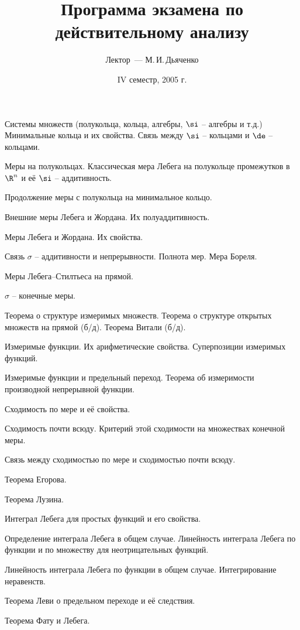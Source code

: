 \documentclass[a4paper]{article}
\title{Программа экзамена по действительному анализу}
\author{Лектор~--- М.\,И.\,Дьяченко}
\date{IV семестр, 2005 г.}
\begin{document}
\maketitle


\begin{nums}{-1}
\item Системы множеств (полукольца, кольца, алгебры, $\si$ -- алгебры и т.д.)
Минимальные кольца и их свойства. Связь между $\si$ -- кольцами и $\de$ -- кольцами.
\item Меры на полукольцах. Классическая мера Лебега на полукольце промежутков в
$\R^n$ и её $\si$ -- аддитивность.
\item Продолжение меры с полукольца на минимальное кольцо.
\item Внешние меры Лебега и Жордана. Их полуаддитивность.
\item Меры Лебега и Жордана. Их свойства.
\item Связь $\sigma $ -- аддитивности и непрерывности. Полнота мер. Мера Бореля.
\item Меры Лебега--Стилтьеса на прямой.
\item $\sigma $ -- конечные меры.
\item Теорема о структуре измеримых множеств. Теорема о структуре открытых множеств на прямой (б/д). Теорема Витали (б/д).
\item Измеримые функции. Их арифметические свойства. Суперпозиции измеримых функций.
\item Измеримые функции и предельный переход. Теорема об измеримости производной непрерывной функции.
\item Сходимость по мере и её свойства.
\item Сходимость почти всюду. Критерий этой сходимости на множествах конечной меры.
\item Связь между сходимостью по мере и сходимостью почти всюду.
\item Теорема Егорова.
\item Теорема Лузина.
\item Интеграл Лебега для простых функций и его свойства.
\item Определение интеграла Лебега в общем случае. Линейность интеграла Лебега
по функции и по множеству для неотрицательных функций.
\item Линейность интеграла Лебега по функции в общем случае. Интегрирование неравенств.
\item Теорема Леви о предельном переходе и её следствия.
\item Теорема Фату и Лебега.

\end{nums}
\end{document}
